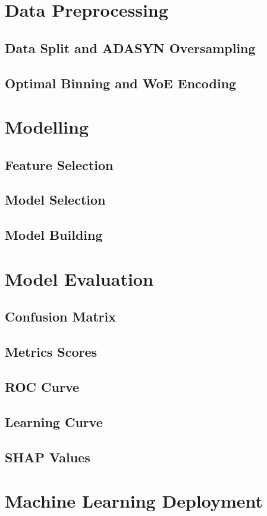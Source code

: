 \section{Data Preprocessing}
\subsection{Data Split and ADASYN Oversampling}
\subsection{Optimal Binning and WoE Encoding}
\section{Modelling}
\subsection{Feature Selection}
\subsection{Model Selection}
\subsection{Model Building}
\section{Model Evaluation}
\subsection{Confusion Matrix}
\subsection{Metrics Scores}
\subsection{ROC Curve}
\subsection{Learning Curve}
\subsection{SHAP Values}
\section{Machine Learning Deployment}
